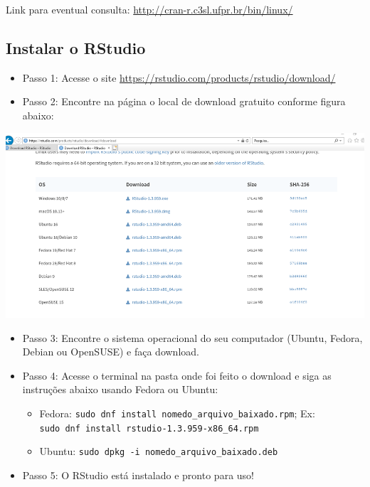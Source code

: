 \documentclass[
  10pt,
  brazil,
  a4paper,
  twoside, notitlepage, openright]{book}
\providecommand{\tightlist}{%
  \setlength{\itemsep}{0pt}\setlength{\parskip}{0pt}}
\begin{document}
Link para eventual consulta: \url{http://cran-r.c3sl.ufpr.br/bin/linux/}

\hypertarget{instalar-o-rstudio}{%
\subsection{Instalar o RStudio}\label{instalar-o-rstudio}}

\begin{itemize}
\tightlist
\item
  Passo 1: Acesse o site \url{https://rstudio.com/products/rstudio/download/}\\
\item
  Passo 2: Encontre na página o local de download gratuito conforme figura abaixo:
\end{itemize}

\includegraphics[width=13.54in]{img/inst_1_rstudio}

\begin{itemize}
\tightlist
\item
  Passo 3: Encontre o sistema operacional do seu computador (Ubuntu, Fedora, Debian ou OpenSUSE) e faça download.\\
\item
  Passo 4: Acesse o terminal na pasta onde foi feito o download e siga as instruções abaixo usando Fedora ou Ubuntu:

  \begin{itemize}
  \tightlist
  \item
    Fedora: \texttt{sudo\ dnf\ install\ nomedo\_arquivo\_baixado.rpm}; Ex: \texttt{sudo\ dnf\ install\ rstudio-1.3.959-x86\_64.rpm}
  \item
    Ubuntu: \texttt{sudo\ dpkg\ -i\ nomedo\_arquivo\_baixado.deb}\\
  \end{itemize}
\item
  Passo 5: O RStudio está instalado e pronto para uso!
\end{itemize}
\end{document}
